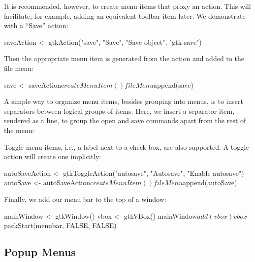 It is recommended, however, to create menu items that proxy an
action. This will facilitate, for example, adding an equivalent
toolbar item later. We demonstrate with a ``Save'' action:
\begin{Schunk}
\begin{Sinput}
 saveAction <- 
   gtkAction("save", "Save", "Save object", "gtk-save")
\end{Sinput}
\end{Schunk}
%
Then the appropriate menu item is generated from the action and added
to the file menu:
\begin{Schunk}
\begin{Sinput}
 save <- saveAction$createMenuItem()
 fileMenu$append(save)
\end{Sinput}
\end{Schunk}

A simple way to organize menu items, besides grouping into menus, is
to insert separators between logical groups of items. Here, we insert
a separator item, rendered as a line, to group the open and save
commands apart from the rest of the menu:
\begin{Schunk}
\end{Schunk}

Toggle menu items, i.e., a label next to a check box, are also
supported. A toggle action will create one implicitly:
\begin{Schunk}
\begin{Sinput}
 autoSaveAction <- gtkToggleAction("autosave", "Autosave", 
                                   "Enable autosave")
 autoSave <- autoSaveAction$createMenuItem()
 fileMenu$append(autoSave)
\end{Sinput}
\end{Schunk}

Finally, we add our menu bar to the top of a window:
\begin{Schunk}
\begin{Sinput}
 mainWindow <- gtkWindow()
 vbox <- gtkVBox()
 mainWindow$add(vbox)
 vbox$packStart(menubar, FALSE, FALSE)
\end{Sinput}
\end{Schunk}

\subsection{Popup Menus}

